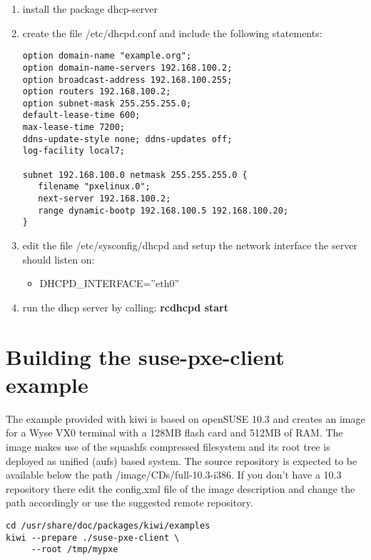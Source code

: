 \begin{enumerate}
\item install the package dhcp-server
\item create the file /etc/dhcpd.conf and include the following
      statements:
 
      \begin{verbatim}
option domain-name "example.org";
option domain-name-servers 192.168.100.2;
option broadcast-address 192.168.100.255;
option routers 192.168.100.2;
option subnet-mask 255.255.255.0;
default-lease-time 600;
max-lease-time 7200;
ddns-update-style none; ddns-updates off;
log-facility local7;

subnet 192.168.100.0 netmask 255.255.255.0 {
   filename "pxelinux.0";
   next-server 192.168.100.2;
   range dynamic-bootp 192.168.100.5 192.168.100.20;
}
\end{verbatim}

\item edit the file /etc/sysconfig/dhcpd and setup the network
      interface the server should listen on:
      \begin{itemize}
      \item DHCPD\_INTERFACE=''eth0''
      \end{itemize}
\item run the dhcp server by calling:
      \textbf{rcdhcpd start}
\end{enumerate}

\section{Building the suse-pxe-client example}

The example provided with kiwi is based on openSUSE 10.3 and creates an
image for a Wyse VX0 terminal with a 128MB flash card and 512MB of RAM.
The image makes use of the squashfs compressed filesystem and its
root tree is deployed as unified (aufs) based system. 
The source repository is expected to be available below the path
/image/CDs/full-10.3-i386. If you don't have a 10.3 repository there
edit the config.xml file of the image description and change the
path accordingly or use the suggested remote repository.

\begin{Command}{12cm}
\begin{verbatim}
cd /usr/share/doc/packages/kiwi/examples
kiwi --prepare ./suse-pxe-client \
     --root /tmp/mypxe
\end{verbatim}
\end{Command}

